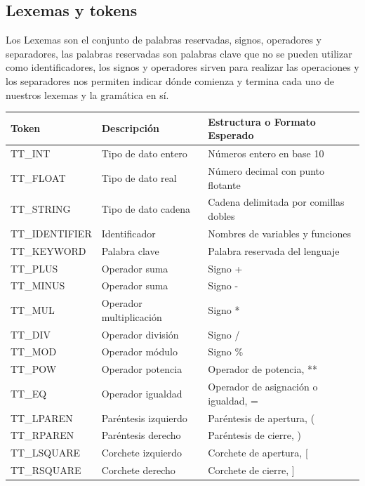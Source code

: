\subsection{Lexemas y tokens}
Los Lexemas son el conjunto de palabras reservadas, signos, operadores y separadores, las palabras reservadas son palabras clave que no se pueden utilizar como identificadores, los signos y operadores sirven para realizar las operaciones y los separadores nos permiten indicar dónde comienza y termina cada uno de nuestros lexemas y la gramática en sí.
\begin{center}
  \begin{longtable}{|l|m{10em}|m{14em}|}
    \hline
    \textbf{Token} & \textbf{Descripción} & \textbf{Estructura o Formato Esperado} \\
    \hline
    \endfirsthead
    \hline
    \endhead
    \endfoot
    \hline
    TT\_INT & Tipo de dato entero & Números entero en base 10 \\
    \hline
    TT\_FLOAT & Tipo de dato real & Número decimal con punto flotante \\
    \hline
    TT\_STRING & Tipo de dato cadena & Cadena delimitada por comillas dobles \\
    \hline
    TT\_IDENTIFIER & Identificador & Nombres de variables y funciones \\
    \hline
    TT\_KEYWORD & Palabra clave & Palabra reservada del lenguaje \\
    \hline
    TT\_PLUS & Operador suma & Signo + \\
    \hline
    TT\_MINUS & Operador suma & Signo - \\
    \hline
    TT\_MUL & Operador multiplicación & Signo * \\
    \hline
    TT\_DIV & Operador división & Signo / \\
    \hline
    TT\_MOD & Operador módulo & Signo \% \\
    \hline
    TT\_POW & Operador potencia & Operador de potencia, ** \\
    \hline
    TT\_EQ & Operador igualdad & Operador de asignación o igualdad, = \\
    \hline
    TT\_LPAREN & Paréntesis izquierdo & Paréntesis de apertura, ( \\
    \hline
    TT\_RPAREN & Paréntesis derecho & Paréntesis de cierre, ) \\
    \hline
    TT\_LSQUARE & Corchete izquierdo & Corchete de apertura, [ \\
    \hline
    TT\_RSQUARE & Corchete derecho & Corchete de cierre, ] \\

\end{longtable}
\end{center}
